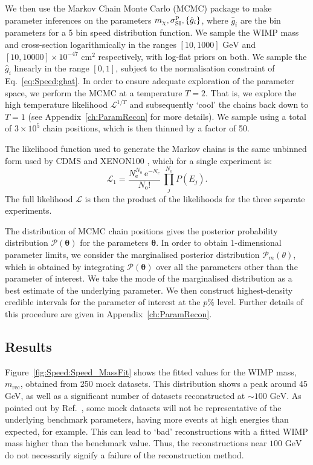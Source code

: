  We then use the Markov Chain Monte Carlo (MCMC) package \cosmomc \cite{Lewis:2002} to make parameter inferences on the parameters $\mchi, \sigmapsi, \left\{\hat{g}_i\right\}$, where $\hat{g}_i$ are the bin parameters for a 5 bin speed distribution function. We sample the WIMP mass and cross-section logarithmically in the ranges \([10, 1000] \textrm{ GeV}\) and \([10, 10000] \times 10^{-47} \textrm{ cm}^2\) respectively, with log-flat priors on both. We sample the $\hat{g}_i$ linearly in the range $[0,1]$, subject to the normalisation constraint of Eq.~\ref{eq:Speed:ghat}. In order to ensure adequate exploration of the parameter space, we perform the MCMC at a temperature $T=2$. That is, we explore the high temperature likelihood $\mathcal{L}^{1/T}$ and subsequently `cool' the chains back down to $T=1$ (see Appendix~\ref{ch:ParamRecon} for more details). We sample using a total of $3 \times 10^5$ chain positions, which is then thinned by a factor of 50.

The likelihood function used to generate the Markov chains is the same unbinned form used by CDMS \cite{Ahmed:2009b} and XENON100 \cite{Aprile:2011}, which for a single experiment is:
\begin{equation}
\label{eq:Speed:unbinnedL}
\mathcal{L}_1 = \frac{N_\textrm{e}^{N_\textrm{o}}\, \textrm{e}^{-N_\textrm{e}}}{N_\textrm{o}!} \, \prod_j^{N_\textrm{o}} P(E_j).
\end{equation}
The full likelihood \(\mathcal{L}\) is then the product of the likelihoods for the three separate experiments.

The distribution of MCMC chain positions gives the posterior probability distribution $\mathcal{P}(\mathbf{\theta})$ for the parameters $\mathbf{\theta}$. In order to obtain 1-dimensional parameter limits, we consider the marginalised posterior distribution $\mathcal{P}_m(\theta)$, which is obtained by integrating $\mathcal{P}(\mathbf{\theta})$ over all the parameters other than the parameter of interest. We take the mode of the marginalised distribution as a best estimate of the underlying parameter. We then construct highest-density credible intervals for the parameter of interest at the $p\%$ level. Further details of this procedure are given in Appendix~\ref{ch:ParamRecon}.

\subsection{Results}
Figure~\ref{fig:Speed:Speed_MassFit} shows the fitted values for the WIMP mass, \(m_\textrm{rec}\), obtained from 250 mock datasets. This distribution shows a peak around 45 GeV, as well as a significant number of datasets reconstructed at \(\sim 100 \textrm{ GeV}\). As pointed out by Ref.\ \cite{Strege:2012}, some mock datasets will not be representative of the underlying benchmark parameters, having more events at high energies than expected, for example. This can lead to `bad' reconstructions with a fitted WIMP mass higher than the benchmark value. Thus, the reconstructions near \(100 \textrm{ GeV}\) do not necessarily signify a failure of the reconstruction method.

